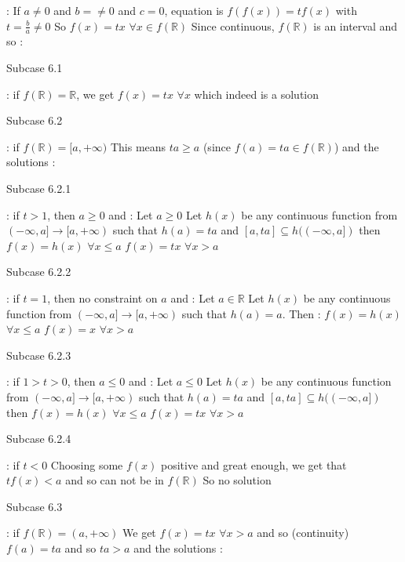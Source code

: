 \begin{solution}
	\begin{tcolorbox} : If $a\ne 0$ and $b=\ne 0$ and $c=0$, equation is $f(f(x))=tf(x)$ with $t=\frac ba\ne 0$
So $f(x)=tx$ $\forall x\in f(\mathbb R)$ 
Since continuous, $f(\mathbb R)$ is an interval and so :

\begin{bolded}Subcase 6.1\end{bolded} : if $f(\mathbb R)=\mathbb R$, we get $f(x)=tx$ $\forall x$ which indeed is a solution

\begin{bolded}Subcase 6.2\end{bolded} : if $f(\mathbb R)=[a,+\infty)$ 
This means $ta\ge a$ (since $f(a)=ta\in f(\mathbb R)$) and the solutions :

\begin{bolded}Subcase 6.2.1\end{bolded} : if $t>1$, then $a\ge 0$ and :
Let $a\ge 0$
Let $h(x)$ be any continuous function from $(-\infty,a]\to[a,+\infty)$ such that $h(a)=ta$ and $[a,ta]\subseteq h((-\infty,a])$ then 
$f(x)=h(x)$ $\forall x\le a$
$f(x)=tx$ $\forall x>a$

\begin{bolded}Subcase 6.2.2\end{bolded} : if $t=1$, then no constraint on $a$ and :
Let $a \in\mathbb R$
Let $h(x)$ be any continuous function from $(-\infty,a]\to[a,+\infty)$ such that $h(a)=a$. Then :
$f(x)=h(x)$ $\forall x\le a$
$f(x)=x$ $\forall x>a$

\begin{bolded}Subcase 6.2.3\end{bolded} : if $1>t>0$, then $a\le 0$ and :
Let $a\le 0$
Let $h(x)$ be any continuous function from $(-\infty,a]\to[a,+\infty)$ such that $h(a)=ta$ and $[a,ta]\subseteq h((-\infty,a])$ then 
$f(x)=h(x)$ $\forall x\le a$
$f(x)=tx$ $\forall x>a$

\begin{bolded}Subcase 6.2.4\end{bolded} : if $t<0$
Choosing some $f(x)$ positive and great enough, we get that $tf(x)<a$ and so can not be in $f(\mathbb R)$
So no solution

\begin{bolded}Subcase 6.3\end{bolded} : if $f(\mathbb R)=(a,+\infty)$
We get $f(x)=tx$ $\forall x>a$ and so (continuity) $f(a)=ta$ and so $ta>a$ and the solutions :


\end{tcolorbox}
\end{solution}
